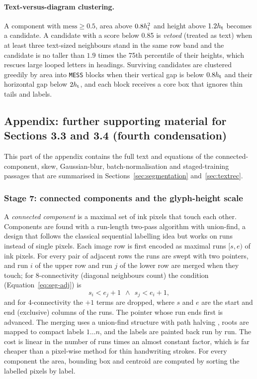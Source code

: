 \paragraph{Text-versus-diagram clustering.}
A component with $\mathrm{mess}\ge0.5$, area above $0.8h_{\mathrm{t}}^2$ and height above $1.2h_{\mathrm{t}}$ becomes a candidate.
A candidate with a score below 0.85 is \emph{vetoed} (treated as text) when at least three text-sized neighbours stand in the same row band and the candidate is no taller than $1.9$ times the 75th percentile of their heights, which rescues large looped letters in headings.
Surviving candidates are clustered greedily by area into \texttt{MESS} blocks when their vertical gap is below $0.8h_{\mathrm{t}}$ and their horizontal gap below $2h_{\mathrm{t}}$, and each block receives a core box that ignores thin tails and labels.



\subsection{Appendix: further supporting material for Sections 3.3 and 3.4 (fourth condensation)}

This part of the appendix contains the full text and equations of the connected-component, skew, Gaussian-blur, batch-normalisation and staged-training passages that are summarised in Sections~\ref{sec:segmentation} and~\ref{sec:textrec}.

\subsubsection{Stage 7: connected components and the glyph-height scale}

A \emph{connected component} is a maximal set of ink pixels that touch each other.
Components are found with a run-length two-pass algorithm with union-find, a design that follows the classical sequential labelling idea \cite{rosenfeld1966} but works on runs instead of single pixels.
Each image row is first encoded as maximal runs $[s,e)$ of ink pixels.
For every pair of adjacent rows the runs are swept with two pointers, and run $i$ of the upper row and run $j$ of the lower row are merged when they touch; for 8-connectivity (diagonal neighbours count) the condition (Equation~\ref{eq:seg-adj}) is
\begin{equation}
s_i<e_j+1\ \ \wedge\ \ s_j<e_i+1,
\label{eq:seg-adj}
\end{equation}
and for 4-connectivity the $+1$ terms are dropped, where $s$ and $e$ are the start and end (exclusive) columns of the runs.
The pointer whose run ends first is advanced.
The merging uses a union-find structure with path halving \cite{tarjan1975}, roots are mapped to compact labels $1\ldots n$, and the labels are painted back run by run.
The cost is linear in the number of runs times an almost constant factor, which is far cheaper than a pixel-wise method for thin handwriting strokes.
For every component the area, bounding box and centroid are computed by sorting the labelled pixels by label.

